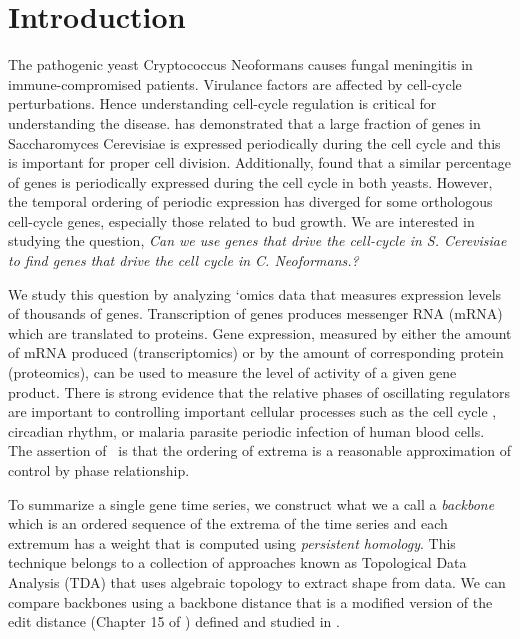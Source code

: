\section{Introduction}
The pathogenic yeast Cryptococcus Neoformans causes fungal meningitis in immune-compromised patients. Virulance factors are affected by cell-cycle perturbations. Hence understanding cell-cycle regulation is critical for understanding the disease.  has demonstrated that a large fraction of genes in Saccharomyces Cerevisiae is expressed periodically during the cell cycle and this is important for proper cell division. Additionally,  found that a similar percentage of genes is periodically expressed during the cell cycle in both yeasts. However, the temporal ordering of periodic expression has diverged for some orthologous cell-cycle genes, especially those related to bud growth. We are interested in studying the question, \textit{Can we use genes that drive the cell-cycle in S. Cerevisiae to find genes that drive the cell cycle in C. Neoformans.?}

We study this question by analyzing `omics data that measures expression levels of thousands of genes. Transcription of genes produces messenger RNA (mRNA) which are translated to proteins. Gene expression, measured by either the amount of mRNA produced (transcriptomics) or by the amount of corresponding protein (proteomics), can be used to measure the level of activity of a given gene product. There is strong evidence that the relative phases of oscillating regulators are important to controlling important cellular processes  such as the cell cycle \cite{SimmonsTranscription08}, circadian rhythm, or malaria parasite periodic infection of human blood cells. The assertion of~\cite{BerryUsing20,CumminsModel18} is that the ordering of extrema is a reasonable approximation of control by phase relationship.

To summarize a single gene time series, we construct what we a call a \emph{backbone} which is an ordered sequence of the extrema of the time series and each extremum has a weight that is computed using \emph{persistent homology}.  This technique belongs to a collection of approaches known as
Topological Data Analysis (TDA) that uses algebraic topology \cite{HatcherAlgebraic02, MunkresElements84} to extract shape from data. We can compare backbones using a backbone distance that is a modified version of the edit distance (Chapter 15 of \cite{CormenIntroduction09})  defined and studied in . 

